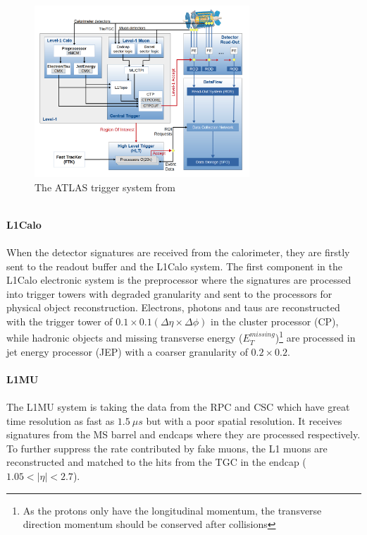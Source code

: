 \begin{figure}[!h]                
	\includegraphics[width=0.72\textwidth]{Chapter2/Trigger.png}
	\centering
	\begin{center}
		\caption{The ATLAS trigger system from \cite{trigger_str}}
		\label{Fig:trigger}            
	\end{center}
\end{figure}
\noindent
\\{\bf L1Calo}
\\
\\When the detector signatures are received from the calorimeter, they are firstly sent to the readout buffer and the L1Calo system. The first component in the L1Calo electronic system is the preprocessor where the signatures are processed into trigger towers with degraded granularity and sent to the processors for physical object reconstruction. Electrons, photons and taus are reconstructed with the trigger tower of $0.1 \times 0.1 (\Delta \eta \times \Delta \phi)$ in the cluster processor (CP), while hadronic objects and missing transverse energy ($E_{T}^{missing}$)\footnote{As the protons only have the longitudinal momentum, the transverse direction momentum should be conserved after collisions} are processed in jet energy processor (JEP) with a coarser granularity of $0.2\times 0.2$.
\\
\\{\bf L1MU}
\\
\\The L1MU system is taking the data from the RPC and CSC which have great time resolution as fast as $1.5~\mu s$ but with a poor spatial resolution. It receives signatures from the MS barrel and endcaps where they are processed respectively. To further suppress the rate contributed by fake muons, the L1 muons are reconstructed and matched to the hits from the TGC in the endcap ($1.05<|\eta|<2.7$). 

